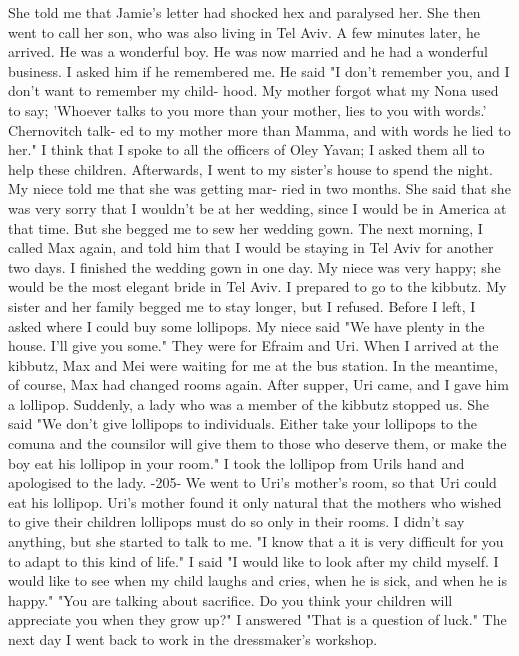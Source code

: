 She told me that Jamie's letter had shocked hex and paralysed her. 
She then went to call her son, who was also living in Tel Aviv. A few 
minutes later, he arrived. He was a wonderful boy. He was now married and he had a wonderful business. I asked him if he remembered me. 
He said "I don't remember you, and I don't want to remember my child-
hood. My mother forgot what my Nona used to say; 'Whoever talks to 
you more than your mother, lies to you with words.' Chernovitch talk-
ed to my mother more than Mamma, and with words he lied to her." 
I think that I spoke to all the officers of Oley Yavan; I asked 
them all to help these children. Afterwards, I went to my sister's 
house to spend the night. My niece told me that she was getting mar-
ried in two months. She said that she was very sorry that I wouldn't 
be at her wedding, since I would be in America at that time. But she 
begged me to sew her wedding gown. 
The next morning, I called Max again, and told him that I would 
be staying in Tel Aviv for another two days. I finished the wedding 
gown in one day. My niece was very happy; she would be the most elegant bride in Tel Aviv. 
I prepared to go to the kibbutz. My sister and her family 
begged me to stay longer, but I refused. Before I left, I asked where 
I could buy some lollipops. My niece said "We have plenty in the 
house. I'll give you some." They were for Efraim and Uri. 
When I arrived at the kibbutz, Max and Mei were waiting for me at 
the bus station. In the meantime, of course, Max had changed rooms again. After supper, Uri came, and I gave him a lollipop. Suddenly, 
a lady who was a member of the kibbutz stopped us. She said "We don't 
give lollipops to individuals. Either take your lollipops to the comuna and the counsilor will give them to those who deserve them, or 
make the boy eat his lollipop in your room." 
I took the lollipop from Urils hand and apologised to the lady. 
-205- 
We went to Uri's mother's room, so that Uri could eat his lollipop. 
Uri's mother found it only natural that the mothers who wished to give 
their children lollipops must do so only in their rooms. I didn't say 
anything, but she started to talk to me. 
"I know that a it is very difficult for you to adapt to this kind 
of life." 
I said "I would like to look after my child myself. I would like 
to see when my child laughs and cries, when he is sick, and when he is 
happy." 
"You are talking about sacrifice. Do you think your children will 
appreciate you when they grow up?" 
I answered "That is a question of luck." 
The next day I went back to work in the dressmaker's workshop. 
